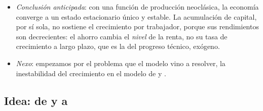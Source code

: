 \documentclass[11pt]{article}
\begin{document}
\begin{itemize}
\item \emph{Conclusión anticipada}: con una función de producción neoclásica, la economía converge a un estado estacionario único y estable. La acumulación de capital, por sí sola, no sostiene el crecimiento por trabajador, porque sus rendimientos son decrecientes: el ahorro cambia el \emph{nivel} de la renta, no su tasa de crecimiento a largo plazo, que es la del progreso técnico, exógeno.
\item \emph{Nexo}: empezamos por el problema que el modelo vino a resolver, la inestabilidad del crecimiento en el modelo de  y .
\end{itemize}

\subsection{Idea: de  y  a }\label{sec:solow-idea}
\end{document}
